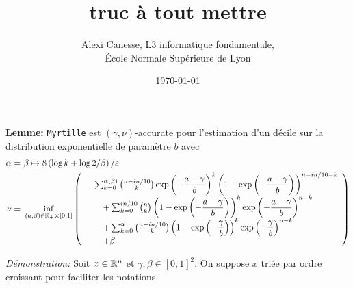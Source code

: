 
\usepackage{tkz-base}
\usepackage{algorithm}
\usepackage{algorithmic}
\setlength\parindent{0pt}





\title{truc à tout mettre}           
\author{Alexi Canesse, L3 informatique fondamentale,\\École Normale Supérieure de Lyon}
\date{\today}          

\sloppy                  

\pgfplotsset{compat=1.16}







\textbf{Lemme: } \texttt{Myrtille} est \((\gamma, \nu)\)-accurate pour l'estimation d'un décile sur la distribution exponentielle de paramètre \(b\) avec
\begin{align*}
    \alpha =&\ \beta \mapsto 8\left( \log k + \log 2/\beta \right)/\varepsilon\\
    \nu = &\ \inf_{(a,\beta) \in \R_+ \times [0,1]} \left( 
        \begin{array}[]{rl}
            &\sum_{k = 0}^{\alpha(\beta)} \binom{n - in/10}{k}\exp\left( -\dfrac{a-\gamma}{b} \right)^k \left( 1 - \exp\left( -\dfrac{a-\gamma}{b} \right) \right)^{n - in/10 -k} \\
            & \quad  + \sum_{k = 0}^{in/10} \binom{n}{k} \left( 1 - \exp\left( -\dfrac{a-\gamma}{b} \right) \right)^k \exp\left( -\dfrac{a-\gamma}{b} \right)^{n-k} \\
            & \quad + \sum_{k = 0}^{\alpha} \binom{n - in/10}{k} \left( 1 - \exp\left( -\dfrac{\gamma}{b} \right) \right)^k \exp\left( -\dfrac{\gamma}{b} \right)^{n-k}\\
            & \quad + \beta 
        \end{array}
    \right)
\end{align*}

\textit{Démonstration:} Soit \(x \in \mathbb{R}^n\) et \(\gamma, \beta \in [0,1]^2\). On suppose \(x\) triée par ordre croissant pour faciliter les notations.\\

